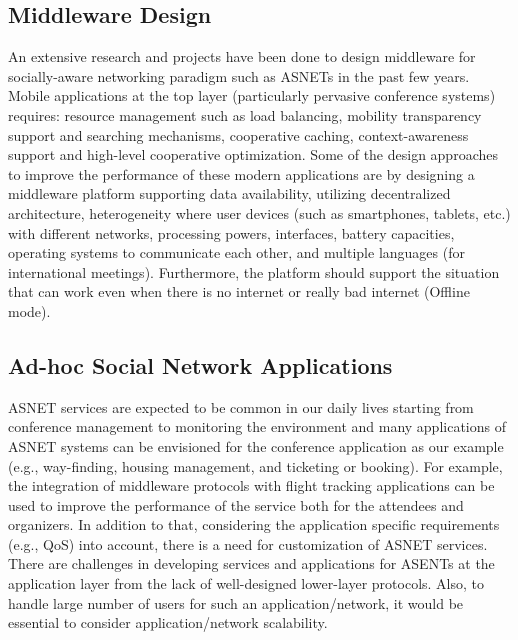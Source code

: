 \subsection{Middleware Design}\label{Chap2_07_03}
An extensive research and projects have been done to design middleware for socially-aware networking paradigm such as ASNETs in the past few years. Mobile applications at the top layer (particularly pervasive conference systems) requires: resource management such as load balancing, mobility transparency support and searching mechanisms, cooperative caching, context-awareness support and high-level cooperative optimization. Some of the design approaches to improve the performance of these modern applications are by designing a middleware platform supporting data availability, utilizing decentralized architecture, heterogeneity where user devices (such as smartphones, tablets, etc.) with different networks, processing powers, interfaces, battery capacities, operating systems to communicate each other, and multiple languages (for international meetings). Furthermore, the platform should support the situation that can work even when there is no internet or really bad internet (Offline mode).

\subsection{Ad-hoc Social Network Applications}\label{Chap2_07_04}
ASNET services are expected to be common in our daily lives starting from conference management to monitoring the environment and many applications of ASNET systems can be envisioned for the conference application as our example (e.g., way-finding, housing management, and ticketing or booking). For example, the integration of middleware protocols with flight tracking applications can be used to improve the performance of the service both for the attendees and organizers. In addition to that, considering the application specific requirements (e.g., QoS) into account, there is a need for customization of ASNET services. There are challenges in developing services and applications for ASENTs at the application layer from the lack of well-designed lower-layer protocols. Also, to handle large number of users for such an application/network, it would be essential to consider application/network scalability.

